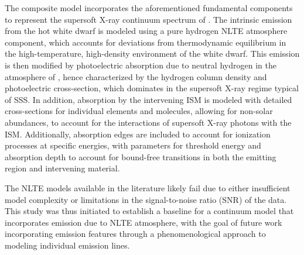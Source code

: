     The composite model incorporates the aforementioned fundamental components to represent the supersoft X-ray continuum spectrum of \source. The intrinsic emission from the hot white dwarf is modeled using a pure hydrogen NLTE atmosphere component, which accounts for deviations from thermodynamic equilibrium in the high-temperature, high-density environment of the white dwarf. This emission is then modified by photoelectric absorption due to neutral hydrogen in the atmosphere of \source, hence characterized by the hydrogen column density and photoelectric cross-section, which dominates in the supersoft X-ray regime typical of SSS. In addition, absorption by the intervening ISM is modeled with detailed cross-sections for individual elements and molecules, allowing for non-solar abundances, to account for the interactions of supersoft X-ray photons with the ISM. Additionally, absorption edges are included to account for ionization processes at specific energies, with parameters for threshold energy and absorption depth to account for bound-free transitions in both the emitting region and intervening material.
    
	The NLTE models available in the literature likely fail due to either insufficient model complexity or limitations in the signal-to-noise ratio (SNR) of the data. This study was thus initiated to establish a baseline for a continuum model that incorporates emission due to NLTE atmosphere, with the goal of future work incorporating emission features through a phenomenological approach to modeling individual emission lines.
   	
